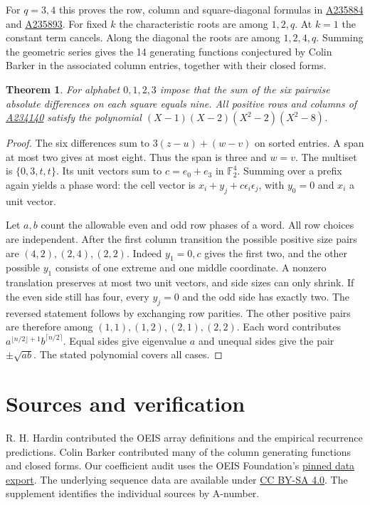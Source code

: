 \documentclass[11pt,letterpaper]{article}
\newtheorem{theorem}{Theorem}[section]
\newcommand{\F}{\mathbb F}
\newcommand{\seqid}[1]{\href{https://oeis.org/A#1}{A#1}}
\begin{document}
For $q=3,4$ this proves the row, column and square-diagonal formulas in \seqid{235884} and \seqid{235893}. For fixed $k$ the characteristic roots are among $1,2,q$. At $k=1$ the constant term cancels. Along the diagonal the roots are among $1,2,4,q$. Summing the geometric series gives the 14 generating functions conjectured by Colin Barker in the associated column entries, together with their closed forms.

\begin{theorem}\label{th:six}
For alphabet $0,1,2,3$ impose that the sum of the six pairwise absolute differences on each square equals nine. All positive rows and columns of \seqid{234140} satisfy the polynomial
$(X-1)(X-2)(X^2-2)(X^2-8)$.
\end{theorem}
\begin{proof}
The six differences sum to $3(z-u)+(w-v)$ on sorted entries. A span at most two gives at most eight. Thus the span is three and $w=v$. The multiset is $\{0,3,t,t\}$. Its unit vectors sum to $c=e_0+e_3$ in $\F_2^4$. Summing over a prefix again yields a phase word: the cell vector is $x_i+y_j+c\epsilon_i\epsilon_j$, with $y_0=0$ and $x_i$ a unit vector.

Let $a,b$ count the allowable even and odd row phases of a word. All row choices are independent. After the first column transition the possible positive size pairs are $(4,2),(2,4),(2,2)$. Indeed $y_1=0,c$ gives the first two, and the other possible $y_1$ consists of one extreme and one middle coordinate. A nonzero translation preserves at most two unit vectors, and side sizes can only shrink. If the even side still has four, every $y_j=0$ and the odd side has exactly two. The reversed statement follows by exchanging row parities. The other positive pairs are therefore among $(1,1),(1,2),(2,1),(2,2)$. Each word contributes $a^{\lfloor n/2\rfloor+1}b^{\lceil n/2\rceil}$. Equal sides give eigenvalue $a$ and unequal sides give the pair $\pm\sqrt{ab}$. The stated polynomial covers all cases.
\end{proof}

\clearpage
\section{Sources and verification}\label{sec:sources}

R. H. Hardin contributed the OEIS array definitions and the empirical recurrence predictions. Colin Barker contributed many of the column generating functions and closed forms. Our coefficient audit uses the OEIS Foundation's
\href{https://github.com/oeis/oeisdata/tree/976b0c73e00453b1c1e6f16d83108cb9bb744c3b}{pinned data export}.
The underlying sequence data are available under
\href{https://creativecommons.org/licenses/by-sa/4.0/}{CC BY-SA 4.0}.
The supplement identifies the individual sources by A-number.
\end{document}
